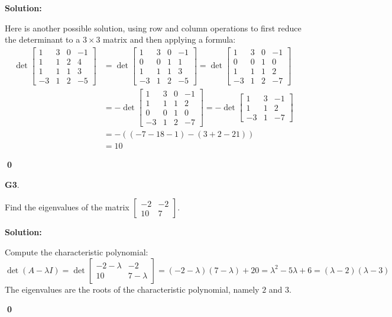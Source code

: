 \documentclass{article}
\newenvironment{problem}[1]
{
  \begin{flushleft}
  \textbf{#1}.
  \ignorespaces
}
{
  \end{flushleft}
}
\newenvironment{solution}
{
  \ignorespaces
  \textbf{Solution:}
}
{
  \ignorespacesafterend
  \begin{flushright}
  {\bfseries \qed}
  \end{flushright}
}
\begin{document}
\begin{solution}
Here is another possible solution, using row and column operations to first reduce
the determinant to a \(3\times 3\) matrix and then applying a formula:
\begin{align*}
\det
  \begin{bmatrix}
    1 & 3 & 0 & -1 \\
    1 & 1 & 2 & 4 \\
    1 & 1 & 1 & 3 \\
    -3 & 1 & 2 & -5
  \end{bmatrix}
&=
\det \begin{bmatrix} 1 & 3 & 0 & -1 \\ 0 & 0 & 1 & 1 \\ 1 & 1 & 1 & 3 \\ -3 & 1 & 2 & -5 \end{bmatrix} =
\det \begin{bmatrix} 1 & 3 & 0 & -1 \\ 0 & 0 & 1 & 0 \\ 1 & 1 & 1 & 2 \\ -3 & 1 & 2 & -7 \end{bmatrix} \\ &=
-\det \begin{bmatrix} 1 & 3 & 0 & -1 \\ 1 & 1 & 1 & 2 \\ 0 & 0 & 1 & 0 \\ -3 & 1 & 2 & -7 \end{bmatrix} =
-\det \begin{bmatrix} 1 & 3 & -1 \\ 1 & 1 & 2 \\ -3 & 1  & -7 \end{bmatrix} \\  &=
-((-7-18-1)-(3+2-21)) \\
 &=10
 \end{align*}



\end{solution}

\begin{problem}{G3}
Find the eigenvalues of the matrix \(\begin{bmatrix} -2 & -2 \\ 10 & 7 \end{bmatrix} \).
\end{problem}
\begin{solution}
Compute the characteristic polynomial: 
\[\det(A-\lambda I) = \det \begin{bmatrix} -2 - \lambda & -2 \\ 10 & 7-\lambda \end{bmatrix} = (-2-\lambda)(7-\lambda)+20 = \lambda ^2 -5\lambda +6 = (\lambda -2)(\lambda -3)\]
The eigenvalues are the roots of the characteristic polynomial, namely $2$ and $3$.
\end{solution}
\end{document}
